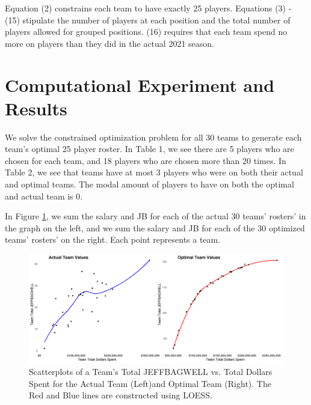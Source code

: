 \documentclass{article}
\begin{document}
Equation (2) constrains each team to have exactly 25 players. Equations (3) - (15) stipulate the number of players at each position and the total number of players allowed for grouped positions.   (16) requires that each team spend no more on players than they did in the actual 2021 season. 

\section{Computational Experiment and Results}

We solve the constrained optimization problem for all 30 teams to generate each team's optimal 25 player roster. In Table 1, we see there are 5 players who are chosen for each team, and 18 players who are chosen more than 20 times. In Table 2, we see that teams have at most 3 players who were on both their actual and optimal teams. The modal amount of players to have on both the optimal and actual team is 0. 

\label{tab:teams_picked}


\label{tab:optimal_and_actual}


In Figure \ref{fig:cowplot}, we sum the salary and JB for each of the actual 30 teams' rosters' in the graph on the left, and we sum the salary and JB for each of the 30 optimized teams' rosters' on the right. Each point represents a team.


\begin{figure}[h]
\caption{Scatterplots of a Team's Total JEFFBAGWELL vs. Total Dollars Spent for the Actual Team (Left)and Optimal Team (Right). The Red and Blue lines are constructed using LOESS.} 
\label{fig:cowplot}
\centering
\includegraphics[width=0.7\paperwidth, scale=1.25]{bwar_salary_scatter_cowplot.png}
\end{figure}
\end{document}
